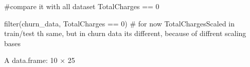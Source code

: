 \documentclass[
  letterpaper,
  DIV=11,
  numbers=noendperiod]{scrreprt}
\newenvironment{Shaded}{\begin{snugshade}}{\end{snugshade}}
\newcommand{\CommentTok}[1]{\textcolor[rgb]{0.37,0.37,0.37}{#1}}
\newcommand{\DecValTok}[1]{\textcolor[rgb]{0.68,0.00,0.00}{#1}}
\newcommand{\FunctionTok}[1]{\textcolor[rgb]{0.28,0.35,0.67}{#1}}
\newcommand{\NormalTok}[1]{\textcolor[rgb]{0.00,0.23,0.31}{#1}}
\newcommand{\SpecialCharTok}[1]{\textcolor[rgb]{0.37,0.37,0.37}{#1}}
\begin{document}
\begin{Shaded}
\begin{Highlighting}[]
\CommentTok{\#compare it with all dataset TotalCharges == 0}
\end{Highlighting}
\end{Shaded}

\begin{Shaded}
\begin{Highlighting}[]
\FunctionTok{filter}\NormalTok{(churn\_data, TotalCharges }\SpecialCharTok{==} \DecValTok{0}\NormalTok{)}
\CommentTok{\# for now TotalChargesScaled in train/test th same, but in churn data its different, because of diffrent scaling bases}
\end{Highlighting}
\end{Shaded}

A data.frame: 10 × 25
\end{document}
